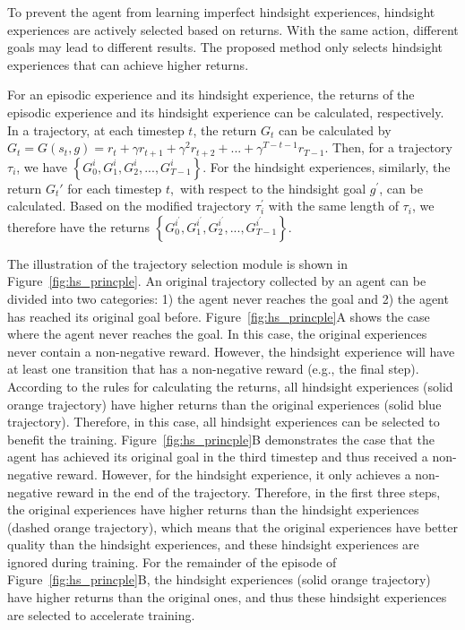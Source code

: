 To prevent the agent from learning imperfect hindsight experiences, {hindsight experiences are actively selected based on returns.} With the same action, different goals may lead to different results. The proposed method only selects hindsight experiences that can achieve higher returns. 

For an episodic experience and its hindsight experience, the returns of the episodic experience and its hindsight experience can be calculated, respectively. 
In a trajectory, at each timestep $t$, the return $G_{t}$ can be calculated by $G_{t} = G(s_t, g) = r_{t} + \gamma r_{t+1} + \gamma^{2} r_{t+2} + ... + \gamma^{T-t-1} r_{T-1}$. Then, for a trajectory $\tau_{i}$, we have $\left\{G_{0}^{i}, G_{1}^{i}, G_{2}^{i}, ..., G_{T-1}^{i}\right\}$. For the hindsight experiences, similarly, the return $G_{t}'$ for each timestep $t$,~with respect to the hindsight goal $g^\prime$, can be calculated. Based on the modified trajectory $\tau_{i}^{\prime}$ with the same length of $\tau_{i}$, we therefore have the returns $\left\{G_{0}^{i^\prime}, G_{1}^{i^\prime}, G_{2}^{i^\prime}, ..., G_{T-1}^{i^\prime}\right\}$. 

The illustration of the trajectory selection module is shown in Figure~\ref{fig:hs_princple}. An original trajectory collected by an agent can be divided into two categories: 1) the agent never reaches the goal and 2) the agent has reached its original goal before. Figure~\ref{fig:hs_princple}A shows the case where the agent never reaches the goal. In this case, the original experiences never contain a non-negative reward. However, the hindsight experience will have at least one transition that has a non-negative reward (e.g., the final step). According to the rules for calculating the returns, all hindsight experiences (solid orange trajectory) have higher returns than the original experiences (solid blue trajectory). Therefore, in this case, all hindsight experiences can be selected to benefit the training. Figure~\ref{fig:hs_princple}B demonstrates the case that the agent has achieved its original goal in the third timestep and thus received a non-negative reward. However, for the hindsight experience, it only achieves a non-negative reward in the end of the trajectory. Therefore, in the first three steps, the original experiences have higher returns than the hindsight experiences (dashed orange trajectory), which means that the original experiences have better quality than the hindsight experiences, and these hindsight experiences are ignored during training. For the remainder of the episode of Figure~\ref{fig:hs_princple}B, the hindsight experiences (solid orange trajectory) have higher returns than the original ones, and thus these hindsight experiences are selected to accelerate training.

